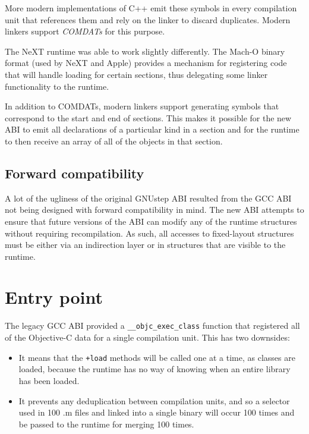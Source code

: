 \documentclass[a4paper]{report}
\newcommand{\file}[1]{\textsf{#1}}
\newcommand{\keyword}[1]{\textit{#1}}
\newcommand{\ccode}[1]{\lstinline[language={C}]{#1}}
\newcommand{\objc}[1]{\lstinline[language={[Objective]C}]{#1}}
\begin{document}
More modern implementations of C++ emit these symbols in every compilation unit that references them and rely on the linker to discard duplicates.
Modern linkers support \keyword{COMDATs} for this purpose.

The NeXT runtime was able to work slightly differently.
The Mach-O binary format (used by NeXT and Apple) provides a mechanism for registering code that will handle loading for certain sections, thus delegating some linker functionality to the runtime.

In addition to COMDATs, modern linkers support generating symbols that correspond to the start and end of sections.
This makes it possible for the new ABI to emit all declarations of a particular kind in a section and for the runtime to then receive an array of all of the objects in that section.

\section{Forward compatibility}

A lot of the ugliness of the original GNUstep ABI resulted from the GCC ABI not being designed with forward compatibility in mind.
The new ABI attempts to ensure that future versions of the ABI can modify any of the runtime structures without requiring recompilation.
As such, all accesses to fixed-layout structures must be either via an indirection layer or in structures that are visible to the runtime.


\chapter{Entry point}

The legacy GCC ABI provided a \ccode{__objc_exec_class} function that registered all of the Objective-C data for a single compilation unit.
This has two downsides:

\begin{itemize}
	\item It means that the \objc{+load} methods will be called one at a time, as classes are loaded, because the runtime has no way of knowing when an entire library has been loaded.
	\item It prevents any deduplication between compilation units, and so a selector used in 100 \file{.m} files and linked into a single binary will occur 100 times and be passed to the runtime for merging 100 times.
\end{itemize}
\end{document}
